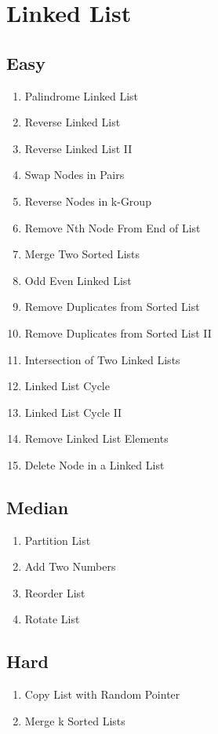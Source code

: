 \documentclass[DIV=calc, paper=a4, fontsize=11pt, twocolumn]{scrartcl}	 %
\begin{document}
\section*{Linked List}

\subsection*{Easy}
\begin{enumerate}
\item Palindrome Linked List \cite{234} 
\item Reverse Linked List \cite{206}
\item Reverse Linked List II \cite{092}
\item Swap Nodes in Pairs \cite{024}
\item Reverse Nodes in k-Group \cite{025}
\item Remove Nth Node From End of List \cite{019}
\item Merge Two Sorted Lists \cite{021}
\item Odd Even Linked List \cite{328}
\item Remove Duplicates from Sorted List \cite{083}
\item Remove Duplicates from Sorted List II \cite{082}
\item Intersection of Two Linked Lists \cite{160}
\item Linked List Cycle \cite{141}
\item Linked List Cycle II \cite{142}
\item Remove Linked List Elements \cite{203}
\item Delete Node in a Linked List \cite{237}
\end{enumerate}
\subsection*{Median}
\begin{enumerate}
\item Partition List \cite{086}
\item Add Two Numbers \cite{002}
\item Reorder List \cite{143}  
\item Rotate List \cite{061}
\end{enumerate}
\subsection*{Hard}
\begin{enumerate}
\item Copy List with Random Pointer \cite{138}
\item Merge k Sorted Lists   \cite{023}
\end{enumerate}
\end{document}
